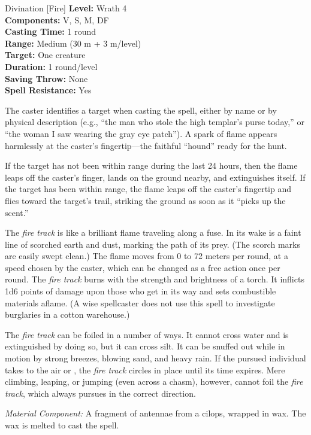 {Divination [Fire]}
{
    \textbf{Level:}
    Wrath 4\\
    \textbf{Components:}
    V, S, M, DF\\
    \textbf{Casting Time:}
    1 round\\
    \textbf{Range:}
    Medium (30 m + 3 m/level)\\
    \textbf{Target:}
    One creature\\
    \textbf{Duration:}
    1 round/level\\
    \textbf{Saving Throw:}
    None\\
    \textbf{Spell Resistance:}
    Yes\\
}
{
    The caster identifies a target when casting the spell, either by name or by physical description (e.g., ``the man who stole the high templar's purse today,'' or ``the woman I saw wearing the gray eye patch''). A spark of flame appears harmlessly at the caster's fingertip---the faithful ``hound'' ready for the hunt.

    If the target has not been within range during the last 24 hours, then the flame leaps off the caster's finger, lands on the ground nearby, and extinguishes itself. If the target has been within range, the flame leaps off the caster's fingertip and flies toward the target's trail, striking the ground as soon as it ``picks up the scent.''

    The \emph{fire track} is like a brilliant flame traveling along a fuse. In its wake is a faint line of scorched earth and dust, marking the path of its prey. (The scorch marks are easily swept clean.) The flame moves from 0 to 72 meters per round, at a speed chosen by the caster, which can be changed as a free action once per round. The \emph{fire track} burns with the strength and brightness of a torch. It inflicts 1d6 points of damage upon those who get in its way and sets combustible materials aflame. (A wise spellcaster does not use this spell to investigate burglaries in a cotton warehouse.)

    The \emph{fire track} can be foiled in a number of ways. It cannot cross water and is extinguished by doing so, but it can cross silt. It can be snuffed out while in motion by strong breezes, blowing sand, and heavy rain. If the pursued individual takes to the air or , the \emph{fire track} circles in place until its time expires. Mere climbing, leaping, or jumping (even across a chasm), however, cannot foil the \emph{fire track}, which always pursues in the correct direction.

    \textit{Material Component:} A fragment of antennae from a cilops, wrapped in wax. The wax is melted to cast the spell.
}
